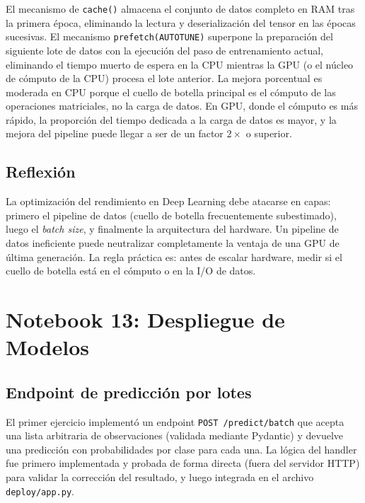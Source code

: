 \documentclass[12pt, a4paper]{article}
\begin{document}
El mecanismo de \texttt{cache()} almacena el conjunto de datos completo en RAM tras la primera época, eliminando la lectura y deserialización del tensor en las épocas sucesivas. El mecanismo \texttt{prefetch(AUTOTUNE)} superpone la preparación del siguiente lote de datos con la ejecución del paso de entrenamiento actual, eliminando el tiempo muerto de espera en la CPU mientras la GPU (o el núcleo de cómputo de la CPU) procesa el lote anterior. La mejora porcentual es moderada en CPU porque el cuello de botella principal es el cómputo de las operaciones matriciales, no la carga de datos. En GPU, donde el cómputo es más rápido, la proporción del tiempo dedicada a la carga de datos es mayor, y la mejora del pipeline puede llegar a ser de un factor $2\times$ o superior.

\subsection{Reflexión}

La optimización del rendimiento en Deep Learning debe atacarse en capas: primero el pipeline de datos (cuello de botella frecuentemente subestimado), luego el \textit{batch size}, y finalmente la arquitectura del hardware. Un pipeline de datos ineficiente puede neutralizar completamente la ventaja de una GPU de última generación. La regla práctica es: antes de escalar hardware, medir si el cuello de botella está en el cómputo o en la I/O de datos.

\section{Notebook 13: Despliegue de Modelos}

\subsection{Endpoint de predicción por lotes}

El primer ejercicio implementó un endpoint \texttt{POST /predict/batch} que acepta una lista arbitraria de observaciones (validada mediante Pydantic) y devuelve una predicción con probabilidades por clase para cada una. La lógica del handler fue primero implementada y probada de forma directa (fuera del servidor HTTP) para validar la corrección del resultado, y luego integrada en el archivo \texttt{deploy/app.py}.
\end{document}
